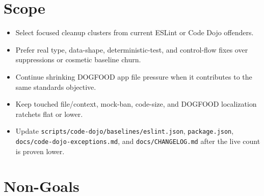 \section{Scope}\label{record-237-scope}

\begin{itemize}
\tightlist
\item
  Select focused cleanup clusters from current ESLint or Code Dojo offenders.
\item
  Prefer real type, data-shape, deterministic-test, and control-flow fixes over suppressions or cosmetic baseline churn.
\item
  Continue shrinking DOGFOOD app file pressure when it contributes to the same standards objective.
\item
  Keep touched file/context, mock-ban, code-size, and DOGFOOD localization ratchets flat or lower.
\item
  Update \texttt{s\allowbreak{}c\allowbreak{}r\allowbreak{}i\allowbreak{}p\allowbreak{}t\allowbreak{}s\allowbreak{}/\allowbreak{}c\allowbreak{}o\allowbreak{}d\allowbreak{}e\allowbreak{}-\allowbreak{}d\allowbreak{}o\allowbreak{}j\allowbreak{}o\allowbreak{}/\allowbreak{}b\allowbreak{}a\allowbreak{}s\allowbreak{}e\allowbreak{}l\allowbreak{}i\allowbreak{}n\allowbreak{}e\allowbreak{}s\allowbreak{}/\allowbreak{}e\allowbreak{}s\allowbreak{}l\allowbreak{}i\allowbreak{}n\allowbreak{}t\allowbreak{}.\allowbreak{}j\allowbreak{}s\allowbreak{}o\allowbreak{}n}, \texttt{p\allowbreak{}a\allowbreak{}c\allowbreak{}k\allowbreak{}a\allowbreak{}g\allowbreak{}e\allowbreak{}.\allowbreak{}j\allowbreak{}s\allowbreak{}o\allowbreak{}n}, \texttt{d\allowbreak{}o\allowbreak{}c\allowbreak{}s\allowbreak{}/\allowbreak{}c\allowbreak{}o\allowbreak{}d\allowbreak{}e\allowbreak{}-\allowbreak{}d\allowbreak{}o\allowbreak{}j\allowbreak{}o\allowbreak{}-\allowbreak{}e\allowbreak{}x\allowbreak{}c\allowbreak{}e\allowbreak{}p\allowbreak{}t\allowbreak{}i\allowbreak{}o\allowbreak{}n\allowbreak{}s\allowbreak{}.\allowbreak{}m\allowbreak{}d}, and \texttt{d\allowbreak{}o\allowbreak{}c\allowbreak{}s\allowbreak{}/\allowbreak{}C\allowbreak{}H\allowbreak{}A\allowbreak{}N\allowbreak{}G\allowbreak{}E\allowbreak{}L\allowbreak{}O\allowbreak{}G\allowbreak{}.\allowbreak{}m\allowbreak{}d} after the live count is proven lower.
\end{itemize}

\section{Non-Goals}\label{record-237-non-goals}

